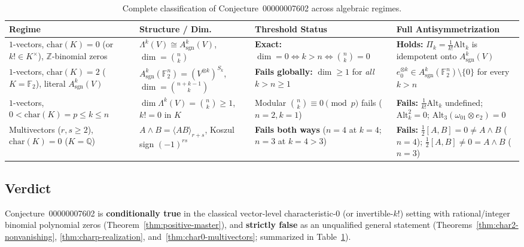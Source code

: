\documentclass[11pt,a4paper]{article}
\theoremstyle{definition}
\theoremstyle{remark}
\newcommand{\Alt}{\mathrm{Alt}}
\newcommand{\sgn}{\mathrm{sgn}}
\newcommand{\F}{\mathbb{F}}
\newcommand{\Q}{\mathbb{Q}}
\newcommand{\Z}{\mathbb{Z}}
\begin{document}
\begin{table}[ht]
\centering
\footnotesize
\renewcommand{\arraystretch}{1.3}
\begin{tabular}{@{}>{\raggedright\arraybackslash}p{}>{\raggedright\arraybackslash}p{}>{\raggedright\arraybackslash}p{}>{\raggedright\arraybackslash}p{}@{}}
\hline
\textbf{Regime} & \textbf{Structure / Dim.} & \textbf{Threshold Status} & \textbf{Full Antisymmetrization} \\
\hline
$1$-vectors, $\mathrm{char}(K)=0$ (or $k! \in K^\times$), $\Z$-binomial zeros &
$\Lambda^k(V) \cong A^k_{\sgn}(V)$, $\dim = \binom{n}{k}$ &
\textbf{Exact:} $\dim = 0 \iff k > n \iff \binom{n}{k} = 0$ &
\textbf{Holds:} $\Pi_k = \frac{1}{k!}\Alt_k$ is idempotent onto $A^k_{\sgn}(V)$ \\
\hline
$1$-vectors, $\mathrm{char}(K)=2$ ($K = \F_2$), literal $A^k_{\sgn}(V)$ &
$A^k_{\sgn}(\F_2^n) = (V^{\otimes k})^{S_k}$, $\dim = \binom{n+k-1}{k}$ &
\textbf{Fails globally:} $\dim \ge 1$ for \emph{all} $k > n \ge 1$ &
$e_0^{\otimes k} \in A^k_{\sgn}(\F_2^n) \setminus \{0\}$ for every $k > n$ \\
\hline
$1$-vectors, $0 < \mathrm{char}(K)=p \le k \le n$ &
$\dim \Lambda^k(V) = \binom{n}{k} \ge 1$, $k! = 0$ in $K$ &
Modular $\binom{n}{k} \equiv 0 \pmod p$ fails ($n=2,k=1$) &
\textbf{Fails:} $\frac{1}{k!}\Alt_k$ undefined; $\Alt_k^2 = 0$; $\Alt_3(\omega_{01} \otimes e_2) = 0$ \\
\hline
Multivectors ($r,s \ge 2$), $\mathrm{char}(K)=0$ ($K = \Q$) &
$A \wedge B = \langle AB \rangle_{r+s}$, Koszul sign $(-1)^{rs}$ &
\textbf{Fails both ways} ($n=4$ at $k=4$; $n=3$ at $k=4>3$) &
\textbf{Fails:} $\frac{1}{2}[A,B] = 0 \neq A \wedge B$ ($n=4$); $\frac{1}{2}[A,B] \neq 0 = A \wedge B$ ($n=3$) \\
\hline
\end{tabular}
\caption{Complete classification of Conjecture~00000007602 across algebraic regimes.}
\label{tab:summary}
\end{table}

\subsection{Verdict}

Conjecture~00000007602 is \textbf{conditionally true} in the classical vector-level characteristic-$0$ (or invertible-$k!$) setting with rational/integer binomial polynomial zeros (Theorem~\ref{thm:positive-master}), and \textbf{strictly false} as an unqualified general statement (Theorems~\ref{thm:char2-nonvanishing}, \ref{thm:charp-realization}, and~\ref{thm:char0-multivectors}; summarized in Table~\ref{tab:summary}).
\end{document}
